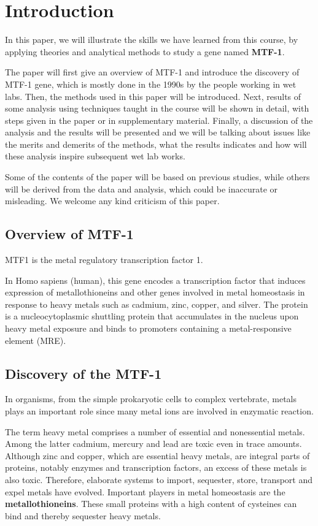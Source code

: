 \section{Introduction}

In this paper, we will illustrate the skills we have learned from this course, by applying theories and analytical methods to study a gene named \textbf{MTF-1}.

The paper will first give an overview of MTF-1 and introduce the discovery of MTF-1 gene, which is mostly done in the 1990s by the people working in wet labs. Then, the methods used in this paper will be introduced. Next, results of some analysis using techniques taught in the course will be shown in detail, with steps given in the paper or in supplementary material. Finally, a discussion of the analysis and the results will be presented and we will be talking about issues like the merits and demerits of the methods, what the results indicates and how will these analysis inspire subsequent wet lab works.

Some of the contents of the paper will be based on previous studies, while others will be derived from the data and analysis, which could be inaccurate or misleading. We welcome any kind 
criticism of this paper.

\subsection{Overview of MTF-1}

MTF1 is the metal regulatory transcription factor 1.

In Homo sapiens (human), this gene encodes a transcription factor that induces expression of metallothioneins and other genes involved in metal homeostasis in response to heavy metals such as cadmium, zinc, copper, and silver. The protein is a nucleocytoplasmic shuttling protein that accumulates in the nucleus upon heavy metal exposure and binds to promoters containing a metal-responsive element (MRE).

\subsection{Discovery of the MTF-1}
In organisms, from the simple prokaryotic cells to complex vertebrate, metals plays an important role since many metal ions are involved in enzymatic reaction. 

The term heavy metal comprises a number of essential and nonessential metals. Among the latter cadmium, mercury and lead are toxic even in trace amounts. Although zinc and copper, which are essential heavy metals, are integral parts of proteins, notably enzymes and transcription factors, an excess of these metals is also toxic. Therefore, elaborate systems to import, sequester, store, transport and expel metals have evolved. Important players in metal homeostasis are the \textbf{metallothioneins}. These small proteins with a high content of cysteines can bind and thereby sequester heavy metals.

